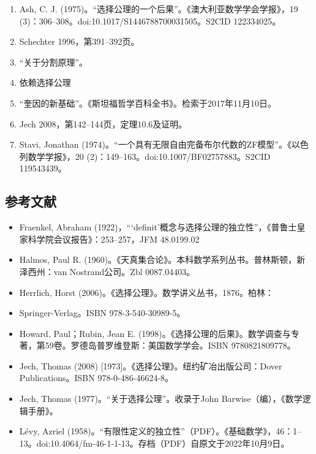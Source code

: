 \begin{enumerate}
\item Ash, C. J. (1975)。“选择公理的一个后果”。《澳大利亚数学学会学报》，19 (3)：306–308。doi:10.1017/S1446788700031505。S2CID 122334025。  
\item Schechter 1996，第391–392页。  
\item “关于分割原理”。  
\item 依赖选择公理  
\item “奎因的新基础”。《斯坦福哲学百科全书》。检索于2017年11月10日。  
\item Jech 2008，第142–144页，定理10.6及证明。  
\item Stavi, Jonathan (1974)。“一个具有无限自由完备布尔代数的ZF模型”。《以色列数学学报》，20 (2)：149–163。doi:10.1007/BF02757883。S2CID 119543439。
\end{enumerate} 
\subsection{参考文献} 
\begin{itemize}
\item Fraenkel, Abraham (1922)，“‘definit’概念与选择公理的独立性”，《普鲁士皇家科学院会议报告》：253–257，JFM 48.0199.02  
\item Halmos, Paul R. (1960)。《天真集合论》。本科数学系列丛书。普林斯顿，新泽西州：van Nostrand公司。Zbl 0087.04403。  
\item Herrlich, Horst (2006)。《选择公理》。数学讲义丛书，1876。柏林：\item Springer-Verlag。ISBN 978-3-540-30989-5。  
\item Howard, Paul；Rubin, Jean E. (1998)。《选择公理的后果》。数学调查与专著，第59卷。罗德岛普罗维登斯：美国数学学会。ISBN 9780821809778。  
\item Jech, Thomas (2008) [1973]。《选择公理》。纽约矿冶出版公司：Dover Publications。ISBN 978-0-486-46624-8。  
\item Jech, Thomas (1977)。“关于选择公理”。收录于John Barwise（编），《数学逻辑手册》。  
\item Lévy, Azriel (1958)。“有限性定义的独立性”（PDF）。《基础数学》，46：1–13。doi:10.4064/fm-46-1-1-13。存档（PDF）自原文于2022年10月9日。
\end{itemize}


